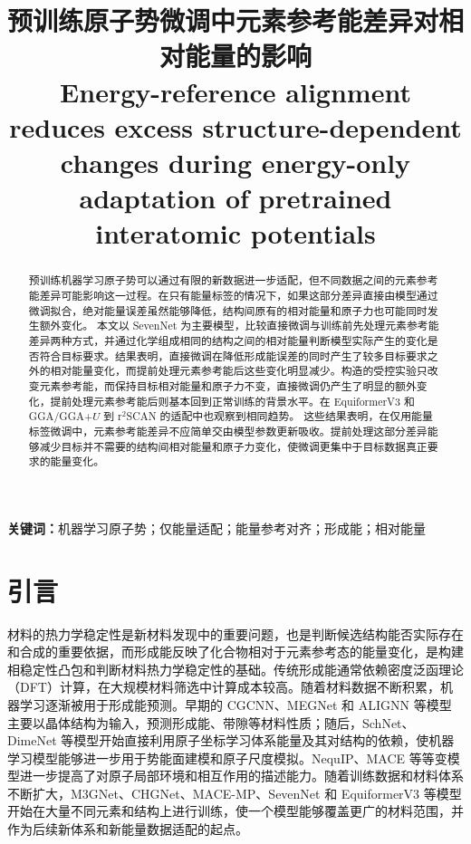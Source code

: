 \documentclass[UTF8,a4paper,12pt,fontset=fandol]{ctexart}
\title{预训练原子势微调中元素参考能差异对相对能量的影响\\[0.45em]\large Energy-reference alignment reduces excess structure-dependent changes during energy-only adaptation of pretrained interatomic potentials}
\author{}
\date{}
\begin{document}
\maketitle

\begin{abstract}
预训练机器学习原子势可以通过有限的新数据进一步适配，但不同数据之间的元素参考能差异可能影响这一过程。在只有能量标签的情况下，如果这部分差异直接由模型通过微调拟合，绝对能量误差虽然能够降低，结构间原有的相对能量和原子力也可能同时发生额外变化。
本文以 SevenNet 为主要模型，比较直接微调与训练前先处理元素参考能差异两种方式，并通过化学组成相同的结构之间的相对能量判断模型实际产生的变化是否符合目标要求。结果表明，直接微调在降低形成能误差的同时产生了较多目标要求之外的相对能量变化，而提前处理元素参考能后这些变化明显减少。构造的受控实验只改变元素参考能，而保持目标相对能量和原子力不变，直接微调仍产生了明显的额外变化，提前处理元素参考能后则基本回到正常训练的背景水平。在 EquiformerV3 和 GGA/GGA+\(U\) 到 r$^2$SCAN 的适配中也观察到相同趋势。
这些结果表明，在仅用能量标签微调中，元素参考能差异不应简单交由模型参数更新吸收。提前处理这部分差异能够减少目标并不需要的结构间相对能量和原子力变化，使微调更集中于目标数据真正要求的能量变化。
\end{abstract}
\noindent\textbf{关键词：}机器学习原子势；仅能量适配；能量参考对齐；形成能；相对能量

\section{引言}
材料的热力学稳定性是新材料发现中的重要问题，也是判断候选结构能否实际存在和合成的重要依据\cite{sun2016thermodynamic}，而形成能反映了化合物相对于元素参考态的能量变化，是构建相稳定性凸包和判断材料热力学稳定性的基础\cite{bartel2020critical}。传统形成能通常依赖密度泛函理论（DFT）计算，在大规模材料筛选中计算成本较高\cite{curtarolo2013high}。随着材料数据不断积累，机器学习逐渐被用于形成能预测\cite{schmidt2019recent}。早期的 CGCNN、MEGNet 和 ALIGNN 等模型主要以晶体结构为输入，预测形成能、带隙等材料性质\cite{xie2018crystal,chen2019graph,choudhary2021atomistic}；随后，SchNet、DimeNet 等模型开始直接利用原子坐标学习体系能量及其对结构的依赖，使机器学习模型能够进一步用于势能面建模和原子尺度模拟\cite{schutt2017schnet,gasteiger2020directional}。NequIP、MACE 等等变模型进一步提高了对原子局部环境和相互作用的描述能力\cite{batzner20223,batatia2022mace}。随着训练数据和材料体系不断扩大，M3GNet、CHGNet、MACE-MP、SevenNet 和 EquiformerV3 等模型开始在大量不同元素和结构上进行训练，使一个模型能够覆盖更广的材料范围，并作为后续新体系和新能量数据适配的起点\cite{chen2022universal,deng2023chgnet,batatia2025foundation,park2024scalable,liao2026equiformerv3}。
\end{document}
